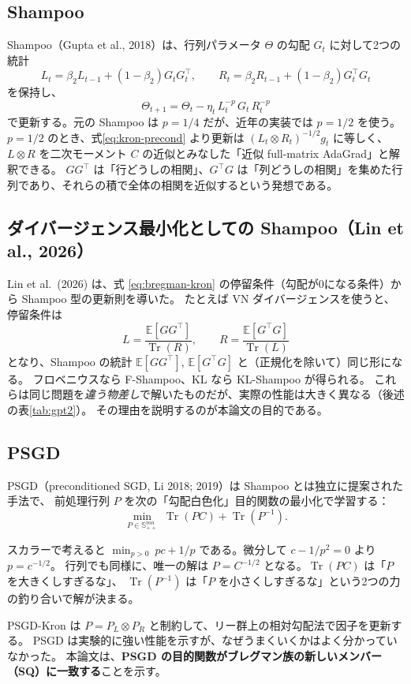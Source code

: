 \documentclass[a4paper,11pt]{ltjsarticle}
\theoremstyle{definition}
\theoremstyle{plain}
\newcommand{\E}{\mathbb{E}}
\newcommand{\Spd}[1]{\mathbb{S}^{#1}_{++}}
\DeclareMathOperator{\Tr}{Tr}
\newcommand{\T}{^{\top}}
\begin{document}
\subsection{Shampoo}

Shampoo（Gupta et al., 2018）は、行列パラメータ $\Theta$ の勾配 $G_t$ に対して2つの統計
\begin{equation}
  L_t = \beta_2L_{t-1} + (1-\beta_2)G_tG_t\T,\qquad R_t = \beta_2R_{t-1} + (1-\beta_2)G_t\T G_t
\end{equation}
を保持し、
\begin{equation}
  \Theta_{t+1} = \Theta_t - \eta_t\,L_t^{-p}\,G_t\,R_t^{-p}
\end{equation}
で更新する。元の Shampoo は $p = 1/4$ だが、近年の実装では $p = 1/2$ を使う。
$p=1/2$ のとき、式\eqref{eq:kron-precond} より更新は $(L_t\otimes R_t)^{-1/2}g_t$ に等しく、
$L\otimes R$ を二次モーメント $C$ の近似とみなした「近似 full-matrix AdaGrad」と解釈できる。
$G G\T$ は「行どうしの相関」、$G\T G$ は「列どうしの相関」を集めた行列であり、それらの積で全体の相関を近似するという発想である。

\subsection{ダイバージェンス最小化としての Shampoo（Lin et al., 2026）}

Lin et al.\ (2026) は、式 \eqref{eq:bregman-kron} の停留条件（勾配が0になる条件）から Shampoo 型の更新則を導いた。
たとえば VN ダイバージェンスを使うと、停留条件は
\[
  L = \frac{\E[GG\T]}{\Tr(R)},\qquad R = \frac{\E[G\T G]}{\Tr(L)}
\]
となり、Shampoo の統計 $\E[GG\T]$, $\E[G\T G]$ と（正規化を除いて）同じ形になる。
フロベニウスなら F-Shampoo、KL なら KL-Shampoo が得られる。
これらは同じ問題を\emph{違う物差し}で解いたものだが、実際の性能は大きく異なる（後述の表\ref{tab:gpt2}）。
その理由を説明するのが本論文の目的である。

\subsection{PSGD}

PSGD（preconditioned SGD, Li 2018; 2019）は Shampoo とは独立に提案された手法で、
前処理行列 $P$ を次の「勾配白色化」目的関数の最小化で学習する：
\begin{equation}\label{eq:psgd}
  \min_{P\in\Spd{mn}}\ \Tr(PC) + \Tr(P^{-1}).
\end{equation}
\begin{intuitionbox}
スカラーで考えると $\min_{p>0}\ pc + 1/p$ である。微分して $c - 1/p^2 = 0$ より $p = c^{-1/2}$。
行列でも同様に、唯一の解は $P = C^{-1/2}$ となる。$\Tr(PC)$ は「$P$ を大きくしすぎるな」、
$\Tr(P^{-1})$ は「$P$ を小さくしすぎるな」という2つの力の釣り合いで解が決まる。
\end{intuitionbox}
PSGD-Kron は $P = P_L\otimes P_R$ と制約して、リー群上の相対勾配法で因子を更新する。
PSGD は実験的に強い性能を示すが、なぜうまくいくかはよく分かっていなかった。
本論文は、\textbf{PSGD の目的関数がブレグマン族の新しいメンバー（SQ）に一致する}ことを示す。
\end{document}
